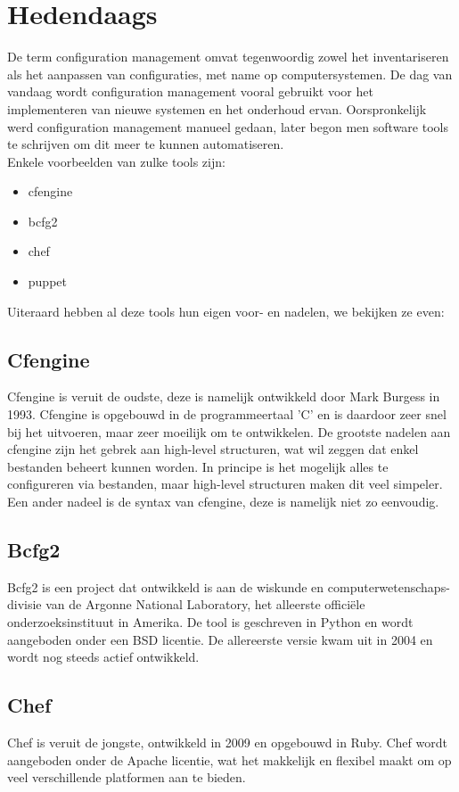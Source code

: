\section{Hedendaags}
De term configuration management omvat tegenwoordig zowel het inventariseren als het aanpassen van configuraties, met name op computersystemen. De dag van vandaag wordt configuration management vooral gebruikt voor het implementeren van nieuwe systemen en het onderhoud ervan. Oorspronkelijk werd configuration management manueel gedaan, later begon men software tools te schrijven om dit meer te kunnen automatiseren.\\
Enkele voorbeelden van zulke tools zijn:
\begin{itemize}
\item cfengine
\item bcfg2
\item chef
\item puppet
\end{itemize}
Uiteraard hebben al deze tools hun eigen voor- en nadelen, we bekijken ze even:
%
\subsection{Cfengine}
Cfengine is veruit de oudste, deze is namelijk ontwikkeld door Mark Burgess in 1993. Cfengine is opgebouwd in de programmeertaal 'C' en is daardoor zeer snel bij het uitvoeren, maar zeer moeilijk om te ontwikkelen. De grootste nadelen aan cfengine zijn het gebrek aan high-level structuren, wat wil zeggen dat enkel bestanden beheert kunnen worden. In principe is het mogelijk alles te configureren via bestanden, maar high-level structuren maken dit veel simpeler. Een ander nadeel is de syntax van cfengine, deze is namelijk niet zo eenvoudig.
%
\subsection{Bcfg2}
Bcfg2 is een project dat ontwikkeld is aan de wiskunde en computerwetenschaps-divisie van de Argonne National Laboratory, het alleerste offici\"ele onderzoeksinstituut in Amerika. De tool is geschreven in Python en wordt aangeboden onder een BSD licentie. De allereerste versie kwam uit in 2004 en wordt nog steeds actief ontwikkeld.
%
\subsection{Chef}
Chef is veruit de jongste, ontwikkeld in 2009 en opgebouwd in Ruby. Chef wordt aangeboden onder de Apache licentie, wat het makkelijk en flexibel maakt om op veel verschillende platformen aan te bieden.
%
